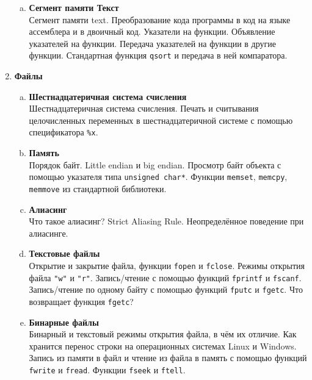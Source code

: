 \documentclass{article}
\begin{document}
\begin{enumerate}
\begin{enumerate}[a.]
\item \textbf{Сегмент памяти Текст}\\
Сегмент памяти text. Преобразование кода программы в код на языке ассемблера и в двоичный код. Указатели на функции. Объявление указателей на функции. Передача указателей на функции в другие функции. Стандартная функция \texttt{qsort} и передача в ней компаратора.
\end{enumerate}



\item \textbf{Файлы}\\

\begin{enumerate}[a.]
\item \textbf{Шестнадцатеричная система счисления}\\
Шестнадцатеричная система счисления. Печать и считывания целочисленных переменных в шестнадцатеричной системе с помощью спецификатора \texttt{\%x}.

\item \textbf{Память}\\
Порядок байт. Little endian и big endian. Просмотр байт объекта с помощью указателя типа \texttt{unsigned char*}. Функции \texttt{memset}, \texttt{memcpy}, \texttt{memmove} из стандартной библиотеки.

\item \textbf{Алиасинг}\\
Что такое алиасинг? Strict Aliasing Rule. Неопределённое поведение при алиасинге. 


\item \textbf{Текстовые файлы}\\
Открытие и закрытие файла, функции \texttt{fopen} и \texttt{fclose}. Режимы открытия файла \texttt{"w"} и \texttt{"r"}.
Запись/чтение с помощью функций \texttt{fprintf} и \texttt{fscanf}. Запись/чтение по одному байту с помощью функций \texttt{fputc} и \texttt{fgetc}. Что возвращает функция \texttt{fgetc}? 


\item \textbf{Бинарные файлы}\\
Бинарный и текстовый режимы открытия файла, в чём их отличие. Как хранится перенос строки на операционных системах Linux и Windows. Запись из памяти в файл и чтение из файла в память с помощью функций \texttt{fwrite} и \texttt{fread}. Функции \texttt{fseek} и \texttt{ftell}.
\end{enumerate}







\end{enumerate}
\end{document}
